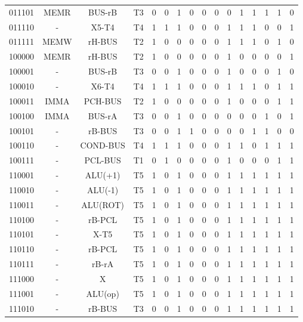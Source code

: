 \documentclass[10pt]{book}
\begin{document}
\begin{longtable}{|c|c|c|c||c|c|c||c|c|c||c|c|c|c|c|c|}
011101 & MEMR		& BUS-rB 		& T3   & 0 & 0 & 1  & 0 & 0 & 0  & 0 & 1 & 1 & 1 & 1 & 0\\
011110 & - 		& X5-T4		& T4   & 1 & 1 & 1  & 0 & 0 & 0  & 1 & 1 & 1 & 0 & 0 & 1 \\
011111 & MEMW		& rH-BUS		& T2   & 1 & 0 & 0  & 0 & 0 & 0  & 1 & 1 & 1 & 0 & 1 & 0 \\
\hline
100000 & MEMR		& rH-BUS		& T2   & 1 & 0 & 0  & 0 & 0 & 0  & 1 & 0 & 0 & 0 & 0 & 1 \\
100001 & - 		& BUS-rB 		& T3   & 0 & 0 & 1  & 0 & 0 & 0  & 1 & 0 & 0 & 0 & 1 & 0 \\
100010 & - 		& X6-T4		& T4   & 1 & 1 & 1  & 0 & 0 & 0  & 1 & 1 & 1 & 0 & 1 & 1 \\
100011 & IMMA		& PCH-BUS		& T2   & 1 & 0 & 0  & 0 & 0 & 0  & 1 & 0 & 0 & 0 & 1 & 1 \\
100100 & IMMA		& BUS-rA		& T3   & 0 & 0 & 1  & 0 & 0 & 0  & 0 & 0 & 0 & 1 & 0 & 1 \\
100101 & - 		& rB-BUS		& T3   & 0 & 0 & 1  & 1 & 0 & 0  & 0 & 0 & 1 & 1 & 0 & 0 \\
100110 & - 		& COND-BUS		& T4   & 1 & 1 & 1  & 0 & 0 & 0  & 1 & 1 & 0 & 1 & 1 & 1 \\
100111 & - 		& PCL-BUS		& T1   & 0 & 1 & 0  & 0 & 0 & 0  & 1 & 0 & 0 & 0 & 1 & 1 \\
110001 & - 		& ALU(+1)		& T5   & 1 & 0 & 1  & 0 & 0 & 0  & 1 & 1 & 1 & 1 & 1 & 1 \\
110010 & - 		& ALU(-1)		& T5   & 1 & 0 & 1  & 0 & 0 & 0  & 1 & 1 & 1 & 1 & 1 & 1 \\
110011 & - 		& ALU(ROT)		& T5   & 1 & 0 & 1  & 0 & 0 & 0  & 1 & 1 & 1 & 1 & 1 & 1 \\
110100 & - 		& rB-PCL		& T5   & 1 & 0 & 1  & 0 & 0 & 0  & 1 & 1 & 1 & 1 & 1 & 1 \\
110101 & - 		& X-T5		& T5   & 1 & 0 & 1  & 0 & 0 & 0  & 1 & 1 & 1 & 1 & 1 & 1 \\
110110 & - 		& rB-PCL		& T5   & 1 & 0 & 1  & 0 & 0 & 0  & 1 & 1 & 1 & 1 & 1 & 1 \\
110111 & - 		& rB-rA		& T5   & 1 & 0 & 1  & 0 & 0 & 0  & 1 & 1 & 1 & 1 & 1 & 1 \\
111000 & - 		& X 			& T5   & 1 & 0 & 1  & 0 & 0 & 0  & 1 & 1 & 1 & 1 & 1 & 1 \\
111001 & - 		& ALU(op)		& T5   & 1 & 0 & 1  & 0 & 0 & 0  & 1 & 1 & 1 & 1 & 1 & 1 \\
111010 & - 		& rB-BUS		& T3   & 0 & 0 & 1  & 0 & 0 & 0  & 1 & 1 & 1 & 1 & 1 & 1 \\

\end{longtable}
\end{document}
